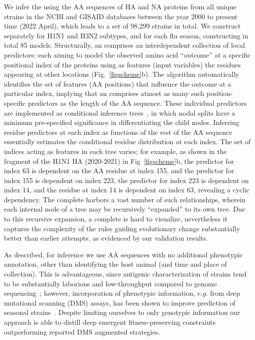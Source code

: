 \documentclass[onecolumn, compsoc,10pt]{IEEEtran}
\begin{document}
We infer the \enet using the AA sequences of HA and NA proteins from  all unique \infl strains in the NCBI and GISAID databases between the year 2000 to present time (2022 April), which leads to a set of 98,299 strains in total. We  construct  separately for H1N1 and H3N2 subtypes, and for each flu season, constructing in total 85 models. %
Structurally, an \enet comprises an interdependent collection of  local predictors: each aiming to model the observed amino acid ``outcome'' at a specific positional index of the proteins using as features (input variables) the residues appearing  at other  locations  (Fig.~\ref{figscheme}b). The algorithm automatically identifies the set of features (AA positions) that influence the outcome at a particular index, implying that an \enet comprises atmost as many such  position-specific predictors as the length of the AA sequence. These individual predictors are implemented as conditional inference trees~\cite{Hothorn06unbiasedrecursive}, in which  nodal splits  have  a minimum pre-specified significance in differentiating the  child nodes. Inferring residue predictors at each  index as  functions of the rest of the AA sequence essentially estimates  the conditional residue distribution  at each index. The set of indices acting as features in each tree varies; for example, as shown in the fragment of the  H1N1 HA \enet (2020-2021) in Fig~\ref{figscheme}b, the predictor for index 63 is dependent on the AA residue at index 155, and the predictor for index 155 is dependent on index 223, the predictor for index 223 is dependent on index 14, and the residue at index 14 is dependent on index 63, revealing a cyclic dependency. The complete \enet harbors a vast number of such  relationships, wherein each internal node of a tree may be recursively ``expanded'' to its own tree. Due to this recursive expansion,  a complete \enet is hard to visualize, nevertheless it captures the complexity of the rules guiding evolutionary change substantially better than earlier attempts, as evidenced by our validation results.


As described, for \enet inference we  use AA sequences with no additional phenotypic annotation, other than identifying the host animal (and time and place of collection). This is advantageous, since antigenic characterization of  \infl strains tend to be substantially  laborious and low-throughput compared to genome sequencing~\cite{wood2012reproducibility}; however,  incorporation of  phenotypic information, $e.g.$ from deep mutational scanning (DMS) assays, has been shown to improve prediction of seasonal strains~\cite{huddleston2020integrating}. Despite limiting ourselves to only genotypic information our approach is able to distill deep emergent  fitness-preserving constraints   outperforming reported DMS  augmented strategies.
\end{document}
